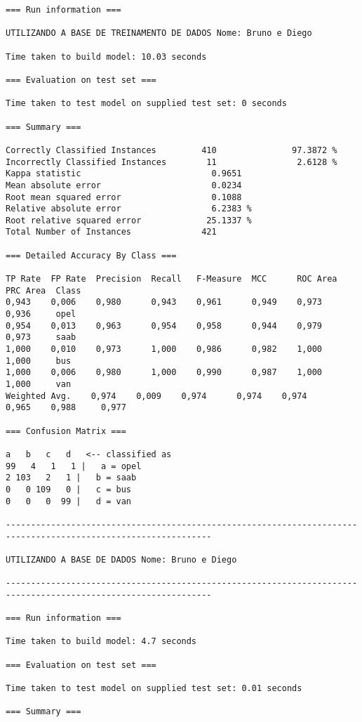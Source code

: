 \documentclass[
	article,			%
	11pt,				%
	oneside,			%
	a4paper,			%
	english,			%
	brazil,				%
	sumario=tradicional
	]{abntex2}
\begin{document}
\begin{lstlisting}
=== Run information ===

UTILIZANDO A BASE DE TREINAMENTO DE DADOS Nome: Bruno e Diego

Time taken to build model: 10.03 seconds

=== Evaluation on test set ===

Time taken to test model on supplied test set: 0 seconds

=== Summary ===

Correctly Classified Instances         410               97.3872 %
Incorrectly Classified Instances        11                2.6128 %
Kappa statistic                          0.9651
Mean absolute error                      0.0234
Root mean squared error                  0.1088
Relative absolute error                  6.2383 %
Root relative squared error             25.1337 %
Total Number of Instances              421     

=== Detailed Accuracy By Class ===

TP Rate  FP Rate  Precision  Recall   F-Measure  MCC      ROC Area  PRC Area  Class
0,943    0,006    0,980      0,943    0,961      0,949    0,973     0,936     opel
0,954    0,013    0,963      0,954    0,958      0,944    0,979     0,973     saab
1,000    0,010    0,973      1,000    0,986      0,982    1,000     1,000     bus
1,000    0,006    0,980      1,000    0,990      0,987    1,000     1,000     van
Weighted Avg.    0,974    0,009    0,974      0,974    0,974      0,965    0,988     0,977     

=== Confusion Matrix ===

a   b   c   d   <-- classified as
99   4   1   1 |   a = opel
2 103   2   1 |   b = saab
0   0 109   0 |   c = bus
0   0   0  99 |   d = van

---------------------------------------------------------------------------------------------------------------

UTILIZANDO A BASE DE DADOS Nome: Bruno e Diego

---------------------------------------------------------------------------------------------------------------

=== Run information ===

Time taken to build model: 4.7 seconds

=== Evaluation on test set ===

Time taken to test model on supplied test set: 0.01 seconds

=== Summary ===


\end{lstlisting}
\end{document}
